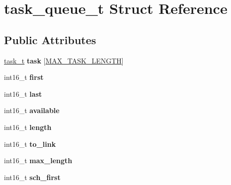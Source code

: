 \hypertarget{structtask__queue__t}{\section{task\+\_\+queue\+\_\+t Struct Reference}
\label{structtask__queue__t}
}
\subsection*{Public Attributes}
\begin{DoxyCompactItemize}
\item 
\hypertarget{structtask__queue__t_ab481f7117967a6f1ffa67875112aadeb}{\hyperlink{structtask__t}{task\+\_\+t} {\bfseries task} \mbox{[}\hyperlink{group__task_ga9a4bac1b8cbff5bb6fdbcbbf7d4bbb1d}{M\+A\+X\+\_\+\+T\+A\+S\+K\+\_\+\+L\+E\+N\+G\+T\+H}\mbox{]}}\label{structtask__queue__t_ab481f7117967a6f1ffa67875112aadeb}

\item 
\hypertarget{structtask__queue__t_a57e611e62253ffa87e5b6de453cbd70e}{int16\+\_\+t {\bfseries first}}\label{structtask__queue__t_a57e611e62253ffa87e5b6de453cbd70e}

\item 
\hypertarget{structtask__queue__t_a7880b10e5e84159f4003e45e2af6d925}{int16\+\_\+t {\bfseries last}}\label{structtask__queue__t_a7880b10e5e84159f4003e45e2af6d925}

\item 
\hypertarget{structtask__queue__t_a43ed6fc2dfab5530c4215373234ce25e}{int16\+\_\+t {\bfseries available}}\label{structtask__queue__t_a43ed6fc2dfab5530c4215373234ce25e}

\item 
\hypertarget{structtask__queue__t_a3183b8a82c212b2d12680915b9058077}{int16\+\_\+t {\bfseries length}}\label{structtask__queue__t_a3183b8a82c212b2d12680915b9058077}

\item 
\hypertarget{structtask__queue__t_ae54ca070be75121a490a078fac53ce4a}{int16\+\_\+t {\bfseries to\+\_\+link}}\label{structtask__queue__t_ae54ca070be75121a490a078fac53ce4a}

\item 
\hypertarget{structtask__queue__t_a0805a1b517604b2a58900093bf44aeaf}{int16\+\_\+t {\bfseries max\+\_\+length}}\label{structtask__queue__t_a0805a1b517604b2a58900093bf44aeaf}

\item 
\hypertarget{structtask__queue__t_a6e23c44945a826d4a1133c670b1cfcb5}{int16\+\_\+t {\bfseries sch\+\_\+first}}\label{structtask__queue__t_a6e23c44945a826d4a1133c670b1cfcb5}


\end{DoxyCompactItemize}
